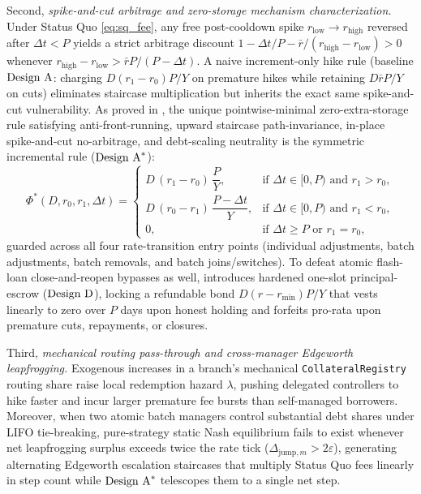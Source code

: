 Second, \emph{spike-and-cut arbitrage and zero-storage mechanism characterization.} Under Status Quo \eqref{eq:sq_fee}, any free post-cooldown spike $r_{\text{low}} \to r_{\text{high}}$ reversed after $\Delta t < P$ yields a strict arbitrage discount $1 - \Delta t/P - \bar{r}/(r_{\text{high}} - r_{\text{low}}) > 0$ whenever $r_{\text{high}} - r_{\text{low}} > \bar{r} P/(P - \Delta t)$. A naive increment-only hike rule (baseline $\text{Design A}$: charging $D(r_1 - r_0)P/Y$ on premature hikes while retaining $D\bar{r}P/Y$ on cuts) eliminates staircase multiplication but inherits the exact same spike-and-cut vulnerability. As proved in \citet{companion2026}, the unique pointwise-minimal zero-extra-storage rule satisfying anti-front-running, upward staircase path-invariance, in-place spike-and-cut no-arbitrage, and debt-scaling neutrality is the symmetric incremental rule ($\text{Design A}^*$):
\begin{equation}\label{eq:design_astar}
\Phi^*(D, r_0, r_1, \Delta t) =
\begin{cases}
D\,(r_1 - r_0)\,\dfrac{P}{Y}, & \text{if } \Delta t \in [0, P) \text{ and } r_1 > r_0,\\[6pt]
D\,(r_0 - r_1)\,\dfrac{P - \Delta t}{Y}, & \text{if } \Delta t \in [0, P) \text{ and } r_1 < r_0,\\[6pt]
0, & \text{if } \Delta t \ge P \text{ or } r_1 = r_0,
\end{cases}
\end{equation}
guarded across all four rate-transition entry points (individual adjustments, batch adjustments, batch removals, and batch joins/switches). To defeat atomic flash-loan close-and-reopen bypasses as well, \citet{companion2026} introduces hardened one-slot principal-escrow ($\text{Design D}$), locking a refundable bond $D(r - r_{\min})P/Y$ that vests linearly to zero over $P$ days upon honest holding and forfeits pro-rata upon premature cuts, repayments, or closures.

Third, \emph{mechanical routing pass-through and cross-manager Edgeworth leapfrogging.} Exogenous increases in a branch's mechanical \texttt{CollateralRegistry} routing share raise local redemption hazard $\lambda$, pushing delegated controllers to hike faster and incur larger premature fee bursts than self-managed borrowers. Moreover, when two atomic batch managers control substantial debt shares under LIFO tie-breaking, pure-strategy static Nash equilibrium fails to exist whenever net leapfrogging surplus exceeds twice the rate tick ($\Delta_{\text{jump}, m} > 2\varepsilon$), generating alternating Edgeworth escalation staircases \citep{maskin1988theory} that multiply Status Quo fees linearly in step count while $\text{Design A}^*$ telescopes them to a single net step.

